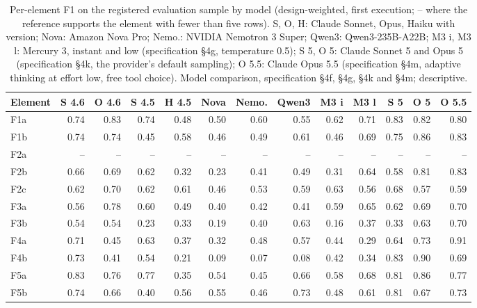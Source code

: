 \begin{table}[htbp]
\centering
\scriptsize
\setlength{\tabcolsep}{4pt}
\begin{threeparttable}
\caption[Per-element F1 by model]{Per-element F1 on the registered evaluation sample by model (design-weighted, first execution; -- where the reference supports the element with fewer than five rows). S, O, H: Claude Sonnet, Opus, Haiku with version; Nova: Amazon Nova Pro; Nemo.: NVIDIA Nemotron 3 Super; Qwen3: Qwen3-235B-A22B; M3 i, M3 l: Mercury 3, instant and low (specification §4g, temperature 0.5); S 5, O 5: Claude Sonnet 5 and Opus 5 (specification §4k, the provider's default sampling); O 5.5: Claude Opus 5.5 (specification §4m, adaptive thinking at effort low, free tool choice). Model comparison, specification §4f, §4g, §4k and §4m; descriptive.}
\label{tab:model_comparison_elements}
\begin{tabular}{@{}lrrrrrrrrrrrr@{}}
\toprule
\textbf{Element} & \textbf{S 4.6} & \textbf{O 4.6} & \textbf{S 4.5} & \textbf{H 4.5} & \textbf{Nova} & \textbf{Nemo.} & \textbf{Qwen3} & \textbf{M3 i} & \textbf{M3 l} & \textbf{S 5} & \textbf{O 5} & \textbf{O 5.5} \\
\midrule
F1a & 0.74 & 0.83 & 0.74 & 0.48 & 0.50 & 0.60 & 0.55 & 0.62 & 0.71 & 0.83 & 0.82 & 0.80 \\
F1b & 0.74 & 0.74 & 0.45 & 0.58 & 0.46 & 0.49 & 0.61 & 0.46 & 0.69 & 0.75 & 0.86 & 0.83 \\
F2a & -- & -- & -- & -- & -- & -- & -- & -- & -- & -- & -- & -- \\
F2b & 0.66 & 0.69 & 0.62 & 0.32 & 0.23 & 0.41 & 0.49 & 0.31 & 0.64 & 0.58 & 0.81 & 0.83 \\
F2c & 0.62 & 0.70 & 0.62 & 0.61 & 0.46 & 0.53 & 0.59 & 0.63 & 0.56 & 0.68 & 0.57 & 0.59 \\
F3a & 0.56 & 0.78 & 0.60 & 0.49 & 0.40 & 0.42 & 0.41 & 0.59 & 0.65 & 0.62 & 0.69 & 0.70 \\
F3b & 0.54 & 0.54 & 0.23 & 0.33 & 0.19 & 0.40 & 0.63 & 0.16 & 0.37 & 0.33 & 0.63 & 0.70 \\
F4a & 0.71 & 0.45 & 0.63 & 0.37 & 0.32 & 0.48 & 0.57 & 0.44 & 0.29 & 0.64 & 0.73 & 0.91 \\
F4b & 0.73 & 0.41 & 0.54 & 0.21 & 0.09 & 0.07 & 0.08 & 0.42 & 0.34 & 0.83 & 0.90 & 0.69 \\
F5a & 0.83 & 0.76 & 0.77 & 0.35 & 0.54 & 0.45 & 0.66 & 0.58 & 0.68 & 0.81 & 0.86 & 0.77 \\
F5b & 0.74 & 0.66 & 0.40 & 0.56 & 0.55 & 0.46 & 0.73 & 0.48 & 0.61 & 0.81 & 0.67 & 0.73 \\

\end{tabular}
\end{threeparttable}
\end{table}
